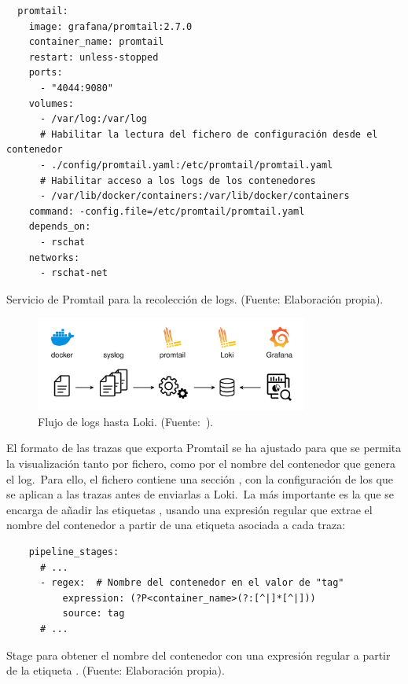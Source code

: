 \begin{codeBlock}
	\begin{verbatim}
  promtail:
    image: grafana/promtail:2.7.0
    container_name: promtail
    restart: unless-stopped
    ports:
      - "4044:9080"
    volumes:
      - /var/log:/var/log
      # Habilitar la lectura del fichero de configuración desde el contenedor
      - ./config/promtail.yaml:/etc/promtail/promtail.yaml
      # Habilitar acceso a los logs de los contenedores
      - /var/lib/docker/containers:/var/lib/docker/containers
    command: -config.file=/etc/promtail/promtail.yaml
    depends_on:
      - rschat
    networks:
      - rschat-net
	\end{verbatim}
	\caption{Servicio de Promtail para la recolección de logs. (Fuente: Elaboración propia).}
	\label{cod:promtail-docker-compose}
\end{codeBlock}

\begin{figure}[ht]
	\centering
	\includegraphics[width=0.8\textwidth]{res/images/loki-promtail-architecture}
	\caption{Flujo de logs hasta Loki. (Fuente:~\cite{log-flow}).}
	\label{fig:promtail}
\end{figure}

El formato de las trazas que exporta Promtail se ha ajustado para que se permita la visualización tanto por fichero,
como por el nombre del contenedor que genera el log.\ Para ello, el fichero 
contiene una sección , con la configuración de los  que se aplican a las
trazas antes de enviarlas a Loki.\ La más importante es la que se encarga de añadir las etiquetas
, usando una expresión regular que extrae el nombre del contenedor a partir de una etiqueta
asociada a cada traza:

\begin{codeBlock}
	\begin{verbatim}
    pipeline_stages:
      # ...
      - regex:  # Nombre del contenedor en el valor de "tag"
          expression: (?P<container_name>(?:[^|]*[^|]))
          source: tag
      # ...
	\end{verbatim}
	\caption{Stage para obtener el nombre del contenedor con una expresión regular a partir de la etiqueta
	. (Fuente: Elaboración propia).}
	\label{cod:promtail-regexp-container-name}
\end{codeBlock}

